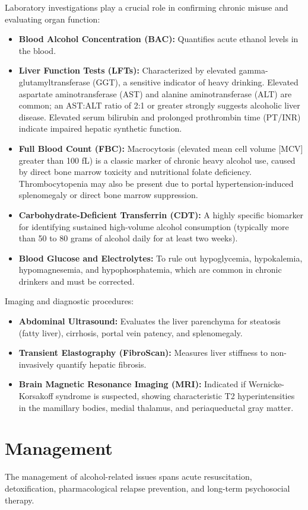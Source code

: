 Laboratory investigations play a crucial role in confirming chronic misuse and evaluating organ function:
\begin{itemize}
    \item \textbf{Blood Alcohol Concentration (BAC):} Quantifies acute ethanol levels in the blood.
    \item \textbf{Liver Function Tests (LFTs):} Characterized by elevated gamma-glutamyltransferase (GGT), a sensitive indicator of heavy drinking. Elevated aspartate aminotransferase (AST) and alanine aminotransferase (ALT) are common; an AST:ALT ratio of 2:1 or greater strongly suggests alcoholic liver disease. Elevated serum bilirubin and prolonged prothrombin time (PT/INR) indicate impaired hepatic synthetic function.
    \item \textbf{Full Blood Count (FBC):} Macrocytosis (elevated mean cell volume [MCV] greater than 100 fL) is a classic marker of chronic heavy alcohol use, caused by direct bone marrow toxicity and nutritional folate deficiency. Thrombocytopenia may also be present due to portal hypertension-induced splenomegaly or direct bone marrow suppression.
    \item \textbf{Carbohydrate-Deficient Transferrin (CDT):} A highly specific biomarker for identifying sustained high-volume alcohol consumption (typically more than 50 to 80 grams of alcohol daily for at least two weeks).
    \item \textbf{Blood Glucose and Electrolytes:} To rule out hypoglycemia, hypokalemia, hypomagnesemia, and hypophosphatemia, which are common in chronic drinkers and must be corrected.
\end{itemize}

Imaging and diagnostic procedures:
\begin{itemize}
    \item \textbf{Abdominal Ultrasound:} Evaluates the liver parenchyma for steatosis (fatty liver), cirrhosis, portal vein patency, and splenomegaly.
    \item \textbf{Transient Elastography (FibroScan):} Measures liver stiffness to non-invasively quantify hepatic fibrosis.
    \item \textbf{Brain Magnetic Resonance Imaging (MRI):} Indicated if Wernicke-Korsakoff syndrome is suspected, showing characteristic T2 hyperintensities in the mamillary bodies, medial thalamus, and periaqueductal gray matter.
\end{itemize}

\section*{Management}
The management of alcohol-related issues spans acute resuscitation, detoxification, pharmacological relapse prevention, and long-term psychosocial therapy.

